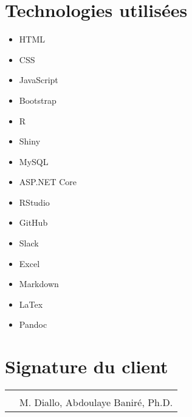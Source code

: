 \documentclass[letter,12pt]{exam}
\begin{document}
\section{Technologies utilisées}

\begin{multicols}{2}
\begin{itemize}
\tightlist
\item
  HTML
\item
  CSS
\item
  JavaScript
\item
  Bootstrap
\item
  R
\item
  Shiny
\item
  MySQL
\item
  ASP.NET Core
\item
  RStudio
\item
  GitHub
\item
  Slack
\item
  Excel
\item
  Markdown
\item
  LaTex
\item
  Pandoc
\end{itemize}
\end{multicols}

\vspace{3cm}

\section{Signature du client}

\vspace{1cm}

\begin{tabular}{@{}p{0.2cm}p{4in}@{}}
& \hrulefill \\
& M. Diallo, Abdoulaye Baniré, Ph.D. \\
\end{tabular}
\end{document}
